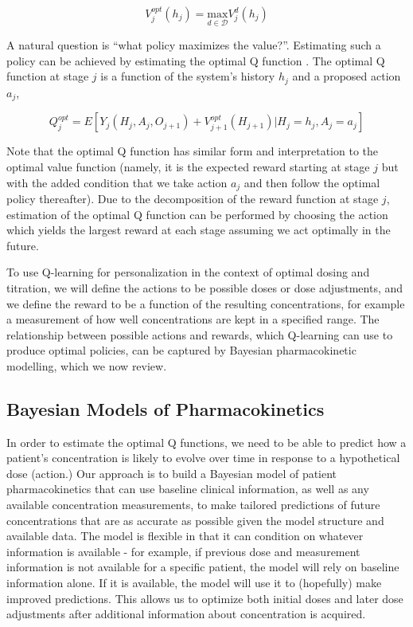 \begin{equation}
V^{opt}_j(h_j) = \underset{d \in \mathscr{D}}{\mbox{max}} V^d_j(h_j)
\end{equation}

\noindent A natural question is “what policy maximizes the value?”. Estimating such a policy can be achieved by estimating the optimal Q function \cite{chakraborty2013statistical}.  The optimal Q function at stage $ j $ is a function of the system’s history $ h_j $ and a proposed action $ a_j $,

\begin{equation}
 Q_j^{opt} = E \left[ 
 Y_j(H_j, A_j, O_{j+1}) + V^{opt}_{j+1}(H_{j+1}) \lvert H_j = h_j, A_j = a_j
 \right]
\end{equation}

Note that the optimal Q function has similar form and interpretation to the optimal value function (namely, it is the expected reward starting at stage $ j $ but with the added condition that we take action $ a_j $ and then follow the optimal policy thereafter). Due to the decomposition of the reward function at stage $ j $, estimation of the optimal Q function can be performed by choosing the action which yields the largest reward at each stage assuming we act optimally in the future. 

To use Q-learning for personalization in the context of optimal dosing and titration, we will define the actions to be possible doses or dose adjustments, and we define the reward to be a function of the resulting concentrations, for example a measurement of how well concentrations are kept in a specified range. The relationship between possible actions and rewards, which Q-learning can use to produce optimal policies, can be captured by Bayesian pharmacokinetic modelling, which we now review.

\subsection{Bayesian Models of Pharmacokinetics}

In order to estimate the optimal Q functions, we need to be able to predict how a patient's concentration is likely to evolve over time in response to a hypothetical dose (action.)  Our approach is to build a Bayesian model of patient pharmacokinetics that can use baseline clinical information, as well as any available concentration measurements, to make tailored predictions of future concentrations that are as accurate as possible given the model structure and available data. The model is flexible in that it can condition on whatever information is available - for example, if previous dose and measurement information is not available for a specific patient, the model will rely on baseline information alone. If it is available, the model will use it to (hopefully) make improved predictions. This allows us to optimize both initial doses and later dose adjustments after additional information about concentration is acquired.

